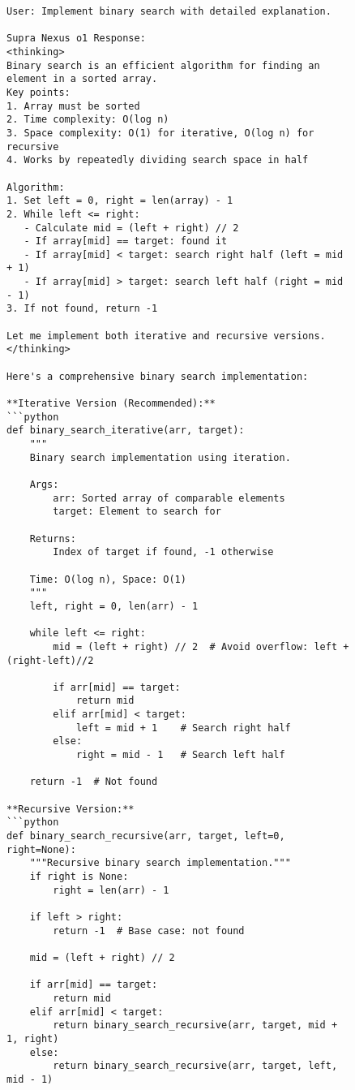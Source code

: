 \begin{table}[H]
\begin{figure}[H]
\begin{lstlisting}[caption=Binary search implementation with reasoning,label=lst:binary-search-example]
User: Implement binary search with detailed explanation.

Supra Nexus o1 Response:
<thinking>
Binary search is an efficient algorithm for finding an element in a sorted array.
Key points:
1. Array must be sorted
2. Time complexity: O(log n)
3. Space complexity: O(1) for iterative, O(log n) for recursive
4. Works by repeatedly dividing search space in half

Algorithm:
1. Set left = 0, right = len(array) - 1
2. While left <= right:
   - Calculate mid = (left + right) // 2
   - If array[mid] == target: found it
   - If array[mid] < target: search right half (left = mid + 1)
   - If array[mid] > target: search left half (right = mid - 1)
3. If not found, return -1

Let me implement both iterative and recursive versions.
</thinking>

Here's a comprehensive binary search implementation:

**Iterative Version (Recommended):**
```python
def binary_search_iterative(arr, target):
    """
    Binary search implementation using iteration.
    
    Args:
        arr: Sorted array of comparable elements
        target: Element to search for
    
    Returns:
        Index of target if found, -1 otherwise
    
    Time: O(log n), Space: O(1)
    """
    left, right = 0, len(arr) - 1
    
    while left <= right:
        mid = (left + right) // 2  # Avoid overflow: left + (right-left)//2
        
        if arr[mid] == target:
            return mid
        elif arr[mid] < target:
            left = mid + 1    # Search right half
        else:
            right = mid - 1   # Search left half
    
    return -1  # Not found

**Recursive Version:**
```python
def binary_search_recursive(arr, target, left=0, right=None):
    """Recursive binary search implementation."""
    if right is None:
        right = len(arr) - 1
    
    if left > right:
        return -1  # Base case: not found
    
    mid = (left + right) // 2
    
    if arr[mid] == target:
        return mid
    elif arr[mid] < target:
        return binary_search_recursive(arr, target, mid + 1, right)
    else:
        return binary_search_recursive(arr, target, left, mid - 1)


\end{lstlisting}
\end{figure}
\end{table}
